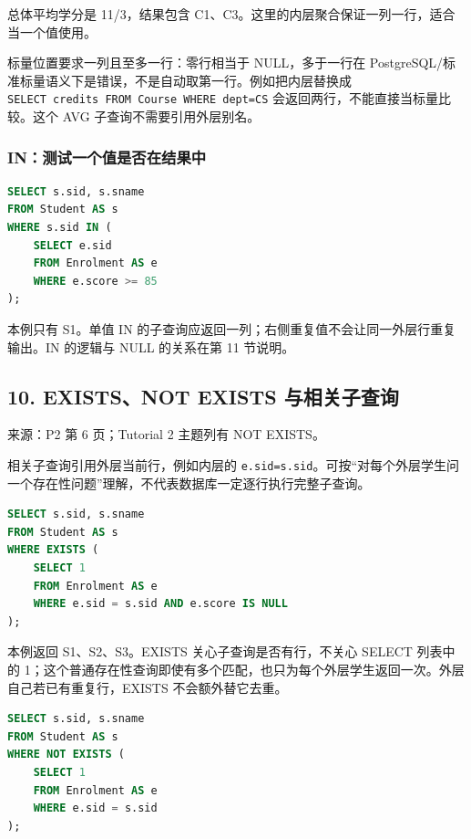 总体平均学分是 11/3，结果包含 C1、C3。这里的内层聚合保证一列一行，适合当一个值使用。

标量位置要求一列且至多一行：零行相当于 NULL，多于一行在 PostgreSQL/标准标量语义下是错误，不是自动取第一行。例如把内层替换成 \texttt{SELECT\ credits\ FROM\ Course\ WHERE\ dept=\textquotesingle{}CS\textquotesingle{}} 会返回两行，不能直接当标量比较。这个 AVG 子查询不需要引用外层别名。

\subsubsection{IN：测试一个值是否在结果中}\label{06_sql_queries_zh-inux6d4bux8bd5ux4e00ux4e2aux503cux662fux5426ux5728ux7ed3ux679cux4e2d}

\Needspace{135pt}
\begin{lstlisting}[language=SQL]
SELECT s.sid, s.sname
FROM Student AS s
WHERE s.sid IN (
    SELECT e.sid
    FROM Enrolment AS e
    WHERE e.score >= 85
);
\end{lstlisting}

本例只有 S1。单值 IN 的子查询应返回一列；右侧重复值不会让同一外层行重复输出。IN 的逻辑与 NULL 的关系在第 11 节说明。

\subsection{10. EXISTS、NOT EXISTS 与相关子查询}\label{06_sql_queries_zh-existsnot-exists-ux4e0eux76f8ux5173ux5b50ux67e5ux8be2}

来源：P2 第 6 页；Tutorial 2 主题列有 NOT EXISTS。

相关子查询引用外层当前行，例如内层的 \texttt{e.\allowbreak{}sid=s.\allowbreak{}sid}。可按``对每个外层学生问一个存在性问题''理解，不代表数据库一定逐行执行完整子查询。

\Needspace{135pt}
\begin{lstlisting}[language=SQL]
SELECT s.sid, s.sname
FROM Student AS s
WHERE EXISTS (
    SELECT 1
    FROM Enrolment AS e
    WHERE e.sid = s.sid AND e.score IS NULL
);
\end{lstlisting}

本例返回 S1、S2、S3。EXISTS 关心子查询是否有行，不关心 SELECT 列表中的 1；这个普通存在性查询即使有多个匹配，也只为每个外层学生返回一次。外层自己若已有重复行，EXISTS 不会额外替它去重。

\Needspace{135pt}
\begin{lstlisting}[language=SQL]
SELECT s.sid, s.sname
FROM Student AS s
WHERE NOT EXISTS (
    SELECT 1
    FROM Enrolment AS e
    WHERE e.sid = s.sid
);
\end{lstlisting}

